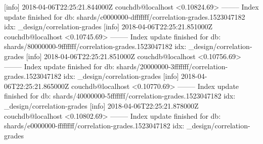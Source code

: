 [info] 2018-04-06T22:25:21.844000Z couchdb@localhost <0.10824.69> -------- Index update finished for db: shards/c0000000-dfffffff/correlation-grades.1523047182 idx: _design/correlation-grades
[info] 2018-04-06T22:25:21.851000Z couchdb@localhost <0.10745.69> -------- Index update finished for db: shards/80000000-9fffffff/correlation-grades.1523047182 idx: _design/correlation-grades
[info] 2018-04-06T22:25:21.851000Z couchdb@localhost <0.10756.69> -------- Index update finished for db: shards/20000000-3fffffff/correlation-grades.1523047182 idx: _design/correlation-grades
[info] 2018-04-06T22:25:21.865000Z couchdb@localhost <0.10770.69> -------- Index update finished for db: shards/40000000-5fffffff/correlation-grades.1523047182 idx: _design/correlation-grades
[info] 2018-04-06T22:25:21.878000Z couchdb@localhost <0.10802.69> -------- Index update finished for db: shards/e0000000-ffffffff/correlation-grades.1523047182 idx: _design/correlation-grades

